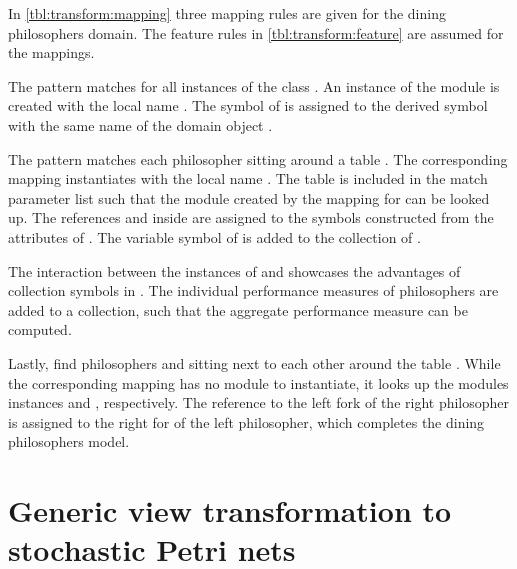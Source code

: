 \begin{table}
\begin{tabular}{@{}>{\centering\arraybackslash}m{}@{}m{}@{}>{\centering\arraybackslash}m{}@{}}
    \bottomrule
  \end{tabular}
\end{table}

\begin{runningExample}
  In \vref{tbl:transform:mapping} three mapping rules are given for the dining philosophers domain. The feature rules in \vref{tbl:transform:feature} are assumed for the mappings.

  The pattern  matches for all instances  of the class . An instance of the module  is created with the local name . The symbol  of  is assigned to the derived symbol with the same name of the domain object .

  The pattern  matches each philosopher  sitting around a table . The corresponding mapping instantiates  with the local name . The table  is included in the match parameter list such that the module  created by the mapping  for  can be looked up. The references  and  inside  are assigned to the symbols constructed from the attributes of . The variable symbol  of  is added to the collection  of .

  The interaction between the instances of  and  showcases the advantages of collection symbols in . The individual performance measures  of philosophers are added to a collection, such that the aggregate performance measure  can be computed.

  Lastly,  find philosophers  and  sitting next to each other around the table . While the corresponding mapping has no  module to instantiate, it looks up the modules instances  and , respectively. The reference to the left fork of the right philosopher is assigned to the right for of the left philosopher, which completes the dining philosophers model.
\end{runningExample}

\section{Generic view transformation to stochastic Petri nets}
\label{chap:transform:view}

